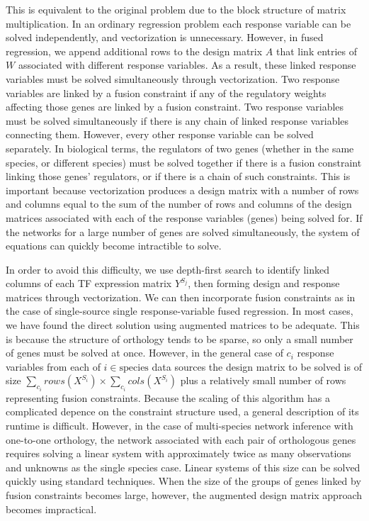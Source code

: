 \documentclass[11pt]{article}
\begin{document}
This is equivalent to the original problem due to the block structure of matrix multiplication. In an ordinary regression problem each response variable can be solved independently, and vectorization is unnecessary. However, in fused regression, we append additional rows to the design matrix $A$ that link entries of $W$ associated with different response variables. As a result, these linked response variables must be solved simultaneously through vectorization. Two response variables are linked by a fusion constraint if any of the regulatory weights affecting those genes are linked by a fusion constraint. Two response variables must be solved simultaneously if there is any chain of linked response variables connecting them. However, every other response variable can be solved separately. In biological terms, the regulators of two genes (whether in the same species, or different species) must be solved together if there is a fusion constraint linking those genes' regulators, or if there is a chain of such constraints. This is important because vectorization produces a design matrix with a number of rows and columns equal to the sum of the number of rows and columns of the design matrices associated with each of the response variables (genes) being solved for. If the networks for a large number of genes are solved simultaneously, the system of equations can quickly become intractible to solve. 

In order to avoid this difficulty, we use depth-first search to identify linked columns of each TF expression matrix $Y^{S_j}$, then forming design and response matrices through vectorization. We can then incorporate fusion constraints as in the case of single-source single response-variable fused regression. In most cases, we have found the direct solution using augmented matrices to be adequate. This is because the structure of orthology tends to be sparse, so only a small number of genes must be solved at once. However, in the general case of $c_i$ response variables from each of $i \in \text{species}$ data sources the design matrix to be solved is of size $\displaystyle \sum_{c_i} rows(X^{S_i}) \times \displaystyle \sum_{c_i} cols(X^{S_i})$ plus a relatively small number of rows representing fusion constraints. Because the scaling of this algorithm has a complicated depence on the constraint structure used, a general description of its runtime is difficult. However, in the case of multi-species network inference with one-to-one orthology, the network associated with each pair of orthologous genes requires solving a linear system with approximately twice as many observations and unknowns as the single species case. Linear systems of this size can be solved quickly using standard techniques. When the size of the groups of genes linked by fusion constraints becomes large, however, the augmented design matrix approach becomes impractical.
\end{document}
